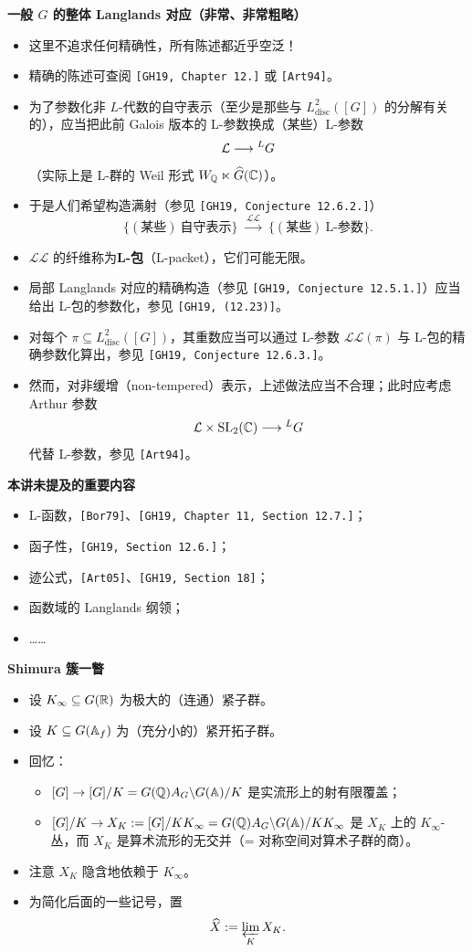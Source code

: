 \medskip
\noindent\textbf{一般 $G$ 的整体 Langlands 对应（非常、非常粗略）}
\begin{itemize}
\item 这里不追求任何精确性，所有陈述都近乎空泛！
\item 精确的陈述可查阅 \texttt{[GH19, Chapter 12.]} 或 \texttt{[Art94]}。
\item 为了参数化非 $L$-代数的自守表示（至少是那些与 $L^2_{\mathrm{disc}}([G])$ 的分解有关的），应当把此前 Galois 版本的 L-参数换成（某些）L-参数
\[
\mathcal{L}\longrightarrow{}^LG
\]
（实际上是 L-群的 Weil 形式 $W_{\mathbb{Q}}\ltimes\widehat G(\mathbb{C})$）。
\item 于是人们希望构造满射（参见 \texttt{[GH19, Conjecture 12.6.2.]}）
\[
\{(\text{某些})\ \text{自守表示}\}\ \xrightarrow{\ \mathcal{LL}\ }\ \{(\text{某些})\ \text{L-参数}\}.
\]
\item $\mathcal{LL}$ 的纤维称为\textbf{L-包}（L-packet），它们可能无限。
\item 局部 Langlands 对应的精确构造（参见 \texttt{[GH19, Conjecture 12.5.1.]}）应当给出 L-包的参数化，参见 \texttt{[GH19, (12.23)]}。
\item 对每个 $\pi\subseteq L^2_{\mathrm{disc}}([G])$，其重数应当可以通过 L-参数 $\mathcal{LL}(\pi)$ 与 L-包的精确参数化算出，参见 \texttt{[GH19, Conjecture 12.6.3.]}。
\item 然而，对非缓增（non-tempered）表示，上述做法应当不合理；此时应考虑 Arthur 参数
\[
\mathcal{L}\times\operatorname{SL}_2(\mathbb{C})\longrightarrow{}^LG
\]
代替 L-参数，参见 \texttt{[Art94]}。
\end{itemize}

\medskip
\noindent\textbf{本讲未提及的重要内容}
\begin{itemize}
\item L-函数，\texttt{[Bor79]}、\texttt{[GH19, Chapter 11, Section 12.7.]}；
\item 函子性，\texttt{[GH19, Section 12.6.]}；
\item 迹公式，\texttt{[Art05]}、\texttt{[GH19, Section 18]}；
\item 函数域的 Langlands 纲领；
\item ……
\end{itemize}

\medskip
\noindent\textbf{Shimura 簇一瞥}
\begin{itemize}
\item 设 $K_\infty\subseteq G(\mathbb{R})$ 为极大的（连通）紧子群。
\item 设 $K\subseteq G(\mathbb{A}_f)$ 为（充分小的）紧开拓子群。
\item 回忆：
\begin{itemize}
\item $[G]\to[G]/K=G(\mathbb{Q})A_G\backslash G(\mathbb{A})/K$ 是实流形上的射有限覆盖；
\item $[G]/K\to X_K:=[G]/KK_\infty=G(\mathbb{Q})A_G\backslash G(\mathbb{A})/KK_\infty$ 是 $X_K$ 上的 $K_\infty$-丛，而 $X_K$ 是算术流形的无交并（= 对称空间对算术子群的商）。
\end{itemize}
\item 注意 $X_K$ 隐含地依赖于 $K_\infty$。
\item 为简化后面的一些记号，置
\[
\widehat X:=\varprojlim_{K}X_K.
\]
\end{itemize}

